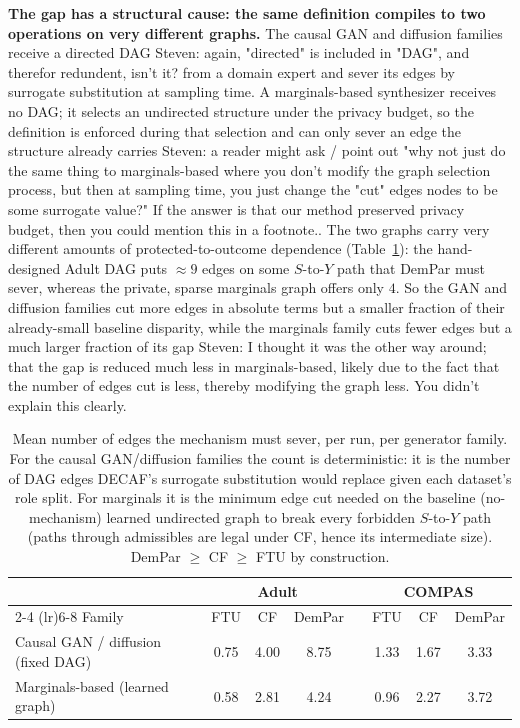 \documentclass{article}
\newcommand{\s}[1]{\textcolor{Dandelion}{Steven: #1}}
\begin{document}
\textbf{The gap has a structural cause: the same definition compiles to two
operations on very different graphs.} The causal GAN and diffusion families
receive a directed DAG \s{again, "directed" is included in "DAG", and therefor redundent, isn't it?} from a domain expert and sever its edges by surrogate
substitution at sampling time. A marginals-based synthesizer receives no DAG;
it selects an undirected structure under the privacy budget, so the definition
is enforced during that selection and can only sever an edge the structure
already carries \s{a reader might ask / point out "why not just do the same thing to marginals-based where you don't modify the graph selection process, but then at sampling time, you just change the "cut" edges nodes to be some surrogate value?" If the answer is that our method preserved privacy budget, then you could mention this in a footnote.}. The two graphs carry very different amounts of
protected-to-outcome dependence (Table~\ref{tab:edges}): the hand-designed
Adult DAG puts $\approx 9$ edges on some $S$-to-$Y$ path that DemPar must
sever, whereas the private, sparse marginals graph offers only $4$. So the GAN
and diffusion families cut more edges in absolute terms but a smaller fraction
of their already-small baseline disparity, while the marginals family cuts
fewer edges but a much larger fraction of its gap \s{I thought it was the other way around; that the gap is reduced much less in marginals-based, likely due to the fact that the number of edges cut is less, thereby modifying the graph less. You didn't explain this clearly}.

\begin{table}[t]
  \caption{Mean number of edges the mechanism must sever, per run, per
  generator family. For the causal GAN/diffusion families the count is
  deterministic: it is the number of DAG edges DECAF's surrogate
  substitution would replace given each dataset's role split. For marginals
  it is the minimum edge cut needed on the baseline (no-mechanism) learned
  undirected graph to break every forbidden $S$-to-$Y$ path (paths through
  admissibles are legal under CF, hence its intermediate size). DemPar
  $\geq$ CF $\geq$ FTU by construction.}
  \label{tab:edges}
  \centering
  \footnotesize
  \setlength{\tabcolsep}{6pt}
  \begin{tabular}{l ccc c ccc}
    \toprule
    & \multicolumn{3}{c}{\textbf{Adult}} & & \multicolumn{3}{c}{\textbf{COMPAS}} \\
    \cmidrule(lr){2-4} \cmidrule(lr){6-8}
    Family & FTU & CF & DemPar & & FTU & CF & DemPar \\
    \midrule
    Causal GAN / diffusion (fixed DAG) & 0.75 & 4.00 & 8.75 & & 1.33 & 1.67 & 3.33 \\
    Marginals-based (learned graph)   & 0.58 & 2.81 & 4.24 & & 0.96 & 2.27 & 3.72 \\
    \bottomrule
  \end{tabular}
\end{table}
\end{document}

